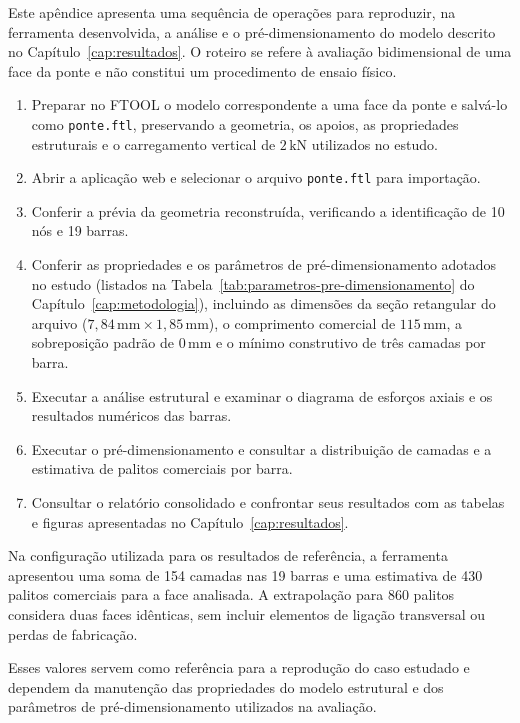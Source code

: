 \label{ap:roteiro-reproducao}

Este apêndice apresenta uma sequência de operações para reproduzir, na ferramenta desenvolvida, a análise e o pré-dimensionamento do modelo descrito no Capítulo~\ref{cap:resultados}. O roteiro se refere à avaliação bidimensional de uma face da ponte e não constitui um procedimento de ensaio físico.

\begin{enumerate}
    \item Preparar no FTOOL o modelo correspondente a uma face da ponte e salvá-lo como \texttt{ponte.ftl}, preservando a geometria, os apoios, as propriedades estruturais e o carregamento vertical de \(2\,\mathrm{kN}\) utilizados no estudo.
    \item Abrir a aplicação web e selecionar o arquivo \texttt{ponte.ftl} para importação.
    \item Conferir a prévia da geometria reconstruída, verificando a identificação de 10 nós e 19 barras.
    \item Conferir as propriedades e os parâmetros de pré-dimensionamento adotados no estudo (listados na Tabela~\ref{tab:parametros-pre-dimensionamento} do Capítulo~\ref{cap:metodologia}), incluindo as dimensões da seção retangular do arquivo (\(7,84\,\mathrm{mm}\times 1,85\,\mathrm{mm}\)), o comprimento comercial de \(115\,\mathrm{mm}\), a sobreposição padrão de \(0\,\mathrm{mm}\) e o mínimo construtivo de três camadas por barra.
    \item Executar a análise estrutural e examinar o diagrama de esforços axiais e os resultados numéricos das barras.
    \item Executar o pré-dimensionamento e consultar a distribuição de camadas e a estimativa de palitos comerciais por barra.
    \item Consultar o relatório consolidado e confrontar seus resultados com as tabelas e figuras apresentadas no Capítulo~\ref{cap:resultados}.
\end{enumerate}

Na configuração utilizada para os resultados de referência, a ferramenta apresentou uma soma de 154 camadas nas 19 barras e uma estimativa de 430 palitos comerciais para a face analisada. A extrapolação para 860 palitos considera duas faces idênticas, sem incluir elementos de ligação transversal ou perdas de fabricação.

Esses valores servem como referência para a reprodução do caso estudado e dependem da manutenção das propriedades do modelo estrutural e dos parâmetros de pré-dimensionamento utilizados na avaliação.
